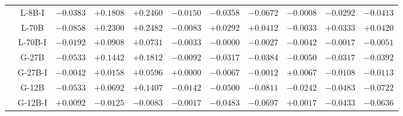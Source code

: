 {\begin{longtable}{|c|c|ccc|ccc|ccc|}
\cline{2-14}
 & L-8B-I & $-0.0383$ & $+0.1808$ & $+0.2460$ & $-0.0150$ & $-0.0358$ & $-0.0672$ & $-0.0008$ & $-0.0292$ & $-0.0413$ \\
\cline{2-14}
 & L-70B & $-0.0858$ & $+0.2300$ & $+0.2482$ & $-0.0083$ & $+0.0292$ & $+0.0412$ & $-0.0033$ & $+0.0333$ & $+0.0420$ \\
\cline{2-14}
 & L-70B-I & $-0.0192$ & $+0.0908$ & $+0.0731$ & $-0.0033$ & $-0.0000$ & $-0.0027$ & $-0.0042$ & $-0.0017$ & $-0.0051$ \\
\cline{2-14}
 & G-27B & $-0.0533$ & $+0.1442$ & $+0.1812$ & $-0.0092$ & $-0.0317$ & $-0.0384$ & $-0.0050$ & $-0.0317$ & $-0.0392$ \\
\cline{2-14}
 & G-27B-I & $-0.0042$ & $+0.0158$ & $+0.0596$ & $+0.0000$ & $-0.0067$ & $-0.0012$ & $+0.0067$ & $-0.0108$ & $-0.0113$ \\
\cline{2-14}
 & G-12B & $-0.0533$ & $+0.0692$ & $+0.1407$ & $-0.0142$ & $-0.0500$ & $-0.0811$ & $-0.0242$ & $-0.0483$ & $-0.0722$ \\
\cline{2-14}
 & G-12B-I & $+0.0092$ & $-0.0125$ & $-0.0083$ & $-0.0017$ & $-0.0483$ & $-0.0697$ & $+0.0017$ & $-0.0433$ & $-0.0636$ \\
\hline
\end{longtable}
}
